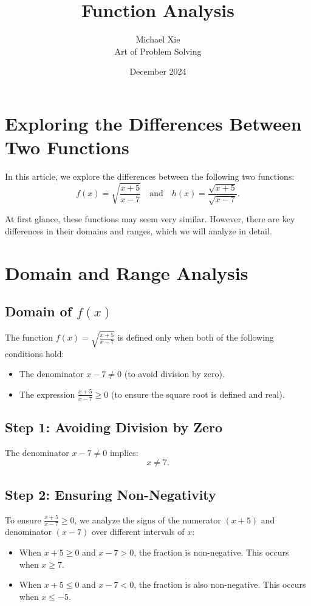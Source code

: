 \documentclass{article}
\title{Function Analysis}
\date{December 2024}
\author{Michael Xie \\ Art of Problem Solving}
\begin{document}
\maketitle

\section*{Exploring the Differences Between Two Functions}

In this article, we explore the differences between the following two functions:
\[
f(x) = \sqrt{\frac{x+5}{x-7}} \quad \text{and} \quad h(x) = \frac{\sqrt{x+5}}{\sqrt{x-7}}.
\]

At first glance, these functions may seem very similar. However, there are key differences in their domains and ranges, which we will analyze in detail. 

\section*{Domain and Range Analysis}

\subsection*{Domain of $f(x)$}
The function $f(x) = \sqrt{\frac{x+5}{x-7}}$ is defined only when both of the following conditions hold:
\begin{itemize}
    \item The denominator $x - 7 \neq 0$ (to avoid division by zero).
    \item The expression $\frac{x+5}{x-7} \geq 0$ (to ensure the square root is defined and real).
\end{itemize}

\subsection*{Step 1: Avoiding Division by Zero}
The denominator $x - 7 \neq 0$ implies:
\[
x \neq 7.
\]

\subsection*{Step 2: Ensuring Non-Negativity}
To ensure $\frac{x+5}{x-7} \geq 0$, we analyze the signs of the numerator $(x+5)$ and denominator $(x-7)$ over different intervals of $x$:
\begin{itemize}
    \item When $x + 5 \geq 0$ and $x - 7 > 0$, the fraction is non-negative. This occurs when $x \geq 7$.
    \item When $x + 5 \leq 0$ and $x - 7 < 0$, the fraction is also non-negative. This occurs when $x \leq -5$.
\end{itemize}
\end{document}
